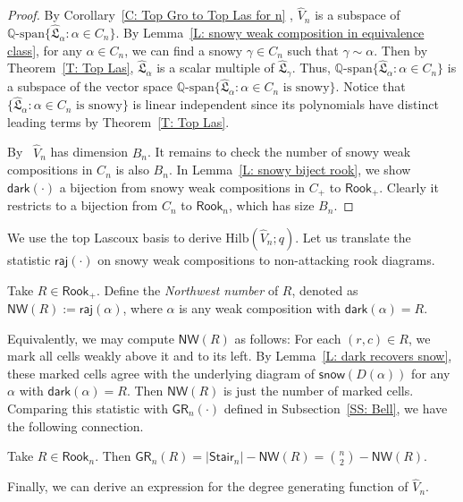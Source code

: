 \documentclass[ALCO]{cedram}
\newcommand{\fL}{\mathfrak{L}}
\newcommand{\topLas}{\widehat{\fL}}
\newcommand{\Q}{\mathbb{Q}}
\newcommand{\dark}{\mathsf{dark}}
\newcommand{\snow}{\mathsf{snow}}
\newcommand{\raj}{\mathsf{raj}}
\newcommand{\Rook}{\mathsf{Rook}}
\newcommand{\Stair}{\mathsf{Stair}}
\newcommand{\GR}{\mathsf{GR}}
\newcommand{\NW}{\mathsf{NW}}
\newcommand{\definition}[1]{{\color{darkred}\emph{#1}}}
\newcommand{\Hilb}{\mathrm{Hilb}}
\begin{document}
\begin{proof}
By Corollary~\ref{C: Top Gro to Top Las for n} ,
$\widehat{V}_n$ is a subspace of 
$\Q\textrm{-span}\{\topLas_\alpha: \alpha \in C_n\}$.
By Lemma~\ref{L: snowy weak composition in equivalence class},
for any $\alpha \in C_n$,
we can find a snowy $\gamma \in C_n$
such that $\gamma \sim \alpha$.
Then by Theorem~\ref{T: Top Las},
$\topLas_\alpha$ is a scalar
multiple of $\topLas_\gamma$.
Thus, 
$\Q\textrm{-span}\{\topLas_\alpha: \alpha \in C_n\}$ is a subspace of the vector space 
$\Q\textrm{-span}\{\topLas_\alpha: \alpha \in C_n \textrm{ is snowy}\}$.
Notice that $\{\topLas_\alpha: \alpha \in C_n \textrm{ is snowy}\}$
is linear independent since its polynomials
have distinct leading terms 
by Theorem~\ref{T: Top Las}.

By~\cite[Theorem~1.4]{PSW}
$\widehat{V}_n$ has dimension $B_n$.
It remains to check the number of snowy weak compositions
in $C_n$ is also $B_n$.
In Lemma~\ref{L: snowy biject rook},
we show $\dark(\cdot)$ a bijection from
snowy weak compositions in $C_+$ to $\Rook_+$.
Clearly it restricts to a bijection from
$C_n$ to $\Rook_n$,
which has size $B_n$.
\end{proof}

We use the top Lascoux basis 
to derive $\Hilb(\widehat{V}_n; q)$. 
Let us translate 
the statistic $\raj(\cdot)$ 
on snowy weak compositions
to non-attacking rook diagrams.

\begin{defn}
Take $R \in \Rook_+$.
Define the \definition{Northwest number} of $R$,
denoted as $\NW(R) := \raj(\alpha)$, 
where $\alpha$ is any weak composition
with $\dark(\alpha) = R$.
\end{defn}

Equivalently, we may compute $\NW(R)$ as follows:
For each $(r,c) \in R$, we mark all cells
weakly above it and to its left.
By Lemma~\ref{L: dark recovers snow},
these marked cells agree with the underlying diagram of $\snow(D(\alpha))$ for any $\alpha$ with $\dark(\alpha) = R$.
Then $\NW(R)$ is just the number of marked cells.
Comparing this statistic with $\GR_n(\cdot)$
defined in Subsection~\ref{SS: Bell},
we have the following connection.

\begin{rem}
\label{R: NW and GR}
Take $R \in \Rook_n$.
Then $\GR_n(R) = |\Stair_n| - \NW(R) = {\binom{n}{2}} - \NW(R)$.
\end{rem}

Finally, we can derive an expression
for the degree generating function of $\widehat{V}_n$.
\end{document}
